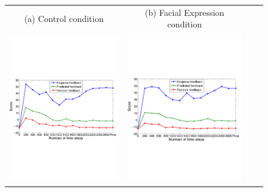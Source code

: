 \documentclass[10pt,journal,compsoc]{IEEEtran}
\begin{document}
\begin{figure}[htb]
\begin{tabular}{c c c c}
(a) Control condition & (b) Facial Expression condition\\
\includegraphics[width=0.95\columnwidth]{cond3.pdf}&
\includegraphics[width=0.95\columnwidth]{cond4.pdf}\\

\end{tabular}
\end{figure}
\end{document}
